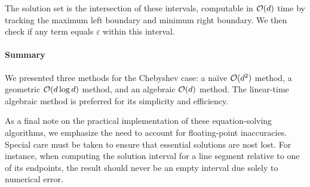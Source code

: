 The solution set is the intersection of these intervals, computable in \(\mathcal{O}(d)\) time by tracking the maximum left boundary and minimum right boundary. We then check if any term equals \(\varepsilon\) within this interval.

\paragraph{Summary}
We presented three methods for the Chebyshev case: a na\"ive \(\mathcal{O}(d^2)\) method, a geometric \(\mathcal{O}(d \log d)\) method, and an algebraic \(\mathcal{O}(d)\) method. The linear-time algebraic method is preferred for its simplicity and efficiency.

As a final note on the practical implementation of these equation-solving algorithms, we emphasize the need to account for floating-point inaccuracies. Special care must be taken to ensure that essential solutions are nost lost. For instance, when computing the solution interval for a line segment relative to one of its endpoints, the result should never be an empty interval due solely to numerical error.
